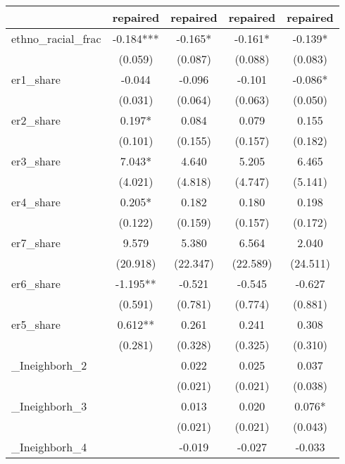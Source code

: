 {
\def\sym#1{\ifmmode^{#1}\else\(^{#1}\)\fi}
\begin{tabular}{l*{4}{c}}
\toprule
          &\multicolumn{1}{c}{repaired}&\multicolumn{1}{c}{repaired}&\multicolumn{1}{c}{repaired}&\multicolumn{1}{c}{repaired}\\
\midrule
ethno\_racial\_frac&   -0.184***&   -0.165*  &   -0.161*  &   -0.139*  \\
          &  (0.059)   &  (0.087)   &  (0.088)   &  (0.083)   \\
\addlinespace
er1\_share &   -0.044   &   -0.096   &   -0.101   &   -0.086*  \\
          &  (0.031)   &  (0.064)   &  (0.063)   &  (0.050)   \\
\addlinespace
er2\_share &    0.197*  &    0.084   &    0.079   &    0.155   \\
          &  (0.101)   &  (0.155)   &  (0.157)   &  (0.182)   \\
\addlinespace
er3\_share &    7.043*  &    4.640   &    5.205   &    6.465   \\
          &  (4.021)   &  (4.818)   &  (4.747)   &  (5.141)   \\
\addlinespace
er4\_share &    0.205*  &    0.182   &    0.180   &    0.198   \\
          &  (0.122)   &  (0.159)   &  (0.157)   &  (0.172)   \\
\addlinespace
er7\_share &    9.579   &    5.380   &    6.564   &    2.040   \\
          & (20.918)   & (22.347)   & (22.589)   & (24.511)   \\
\addlinespace
er6\_share &   -1.195** &   -0.521   &   -0.545   &   -0.627   \\
          &  (0.591)   &  (0.781)   &  (0.774)   &  (0.881)   \\
\addlinespace
er5\_share &    0.612** &    0.261   &    0.241   &    0.308   \\
          &  (0.281)   &  (0.328)   &  (0.325)   &  (0.310)   \\
\addlinespace
\_Ineighborh\_2&            &    0.022   &    0.025   &    0.037   \\
          &            &  (0.021)   &  (0.021)   &  (0.038)   \\
\addlinespace
\_Ineighborh\_3&            &    0.013   &    0.020   &    0.076*  \\
          &            &  (0.021)   &  (0.021)   &  (0.043)   \\
\addlinespace
\_Ineighborh\_4&            &   -0.019   &   -0.027   &   -0.033   \\

\end{tabular}}

